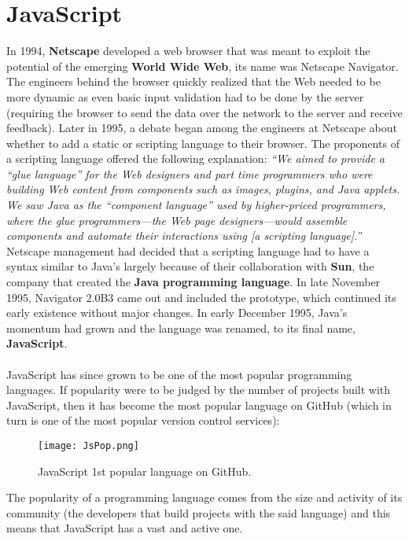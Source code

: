 \documentclass{l4proj}
\begin{document}
\section{JavaScript}
\hspace*{3em} In 1994, \textbf{Netscape} developed a web browser that was meant to exploit the potential of the emerging \textbf{World Wide Web}, its name was Netscape Navigator. The engineers behind the browser quickly realized that the Web needed to be more dynamic as even basic input validation had to be done by the server (requiring the browser to send the data over the network to the server and receive feedback). Later in 1995, a debate began among the engineers at Netscape about whether to add a static or scripting language to their browser. The proponents of a scripting language offered the following explanation: 
\textit{``We aimed to provide a “glue language” for the Web designers and part time programmers who were building Web content from components such as images, plugins, and Java applets. We saw Java as the “component language” used by higher-priced programmers, where the glue programmers—the Web page designers—would assemble components and automate their interactions using [a scripting language].''}\cite{jsgrandpa}
Netscape management had decided that a scripting language had to have a syntax similar to Java’s largely because of their collaboration with \textbf{Sun}, the company that created the \textbf{Java programming language}. In late November 1995, Navigator 2.0B3 came out and included the prototype, which continued its early existence without major changes. In early December 1995, Java’s momentum had grown and the language was renamed, to its final name, \textbf{JavaScript}.\cite{jsdaddy}
\\\\
\hspace*{3em} JavaScript has since grown to be one of the most popular programming languages. If popularity were to be judged by the number of projects built with JavaScript, then it has become the most popular language on GitHub\cite{github} (which in turn is one of the most popular version control services):

\begin{figure}[!ht]
  \centering
    \texttt{[image: JsPop.png]}
    \caption{JavaScript 1st popular language on GitHub.\cite{githut}}
\end{figure}
The popularity of a programming language comes from the size and activity of its community (the developers that build projects with the said language) and this means that JavaScript has a vast and active one.
\end{document}
